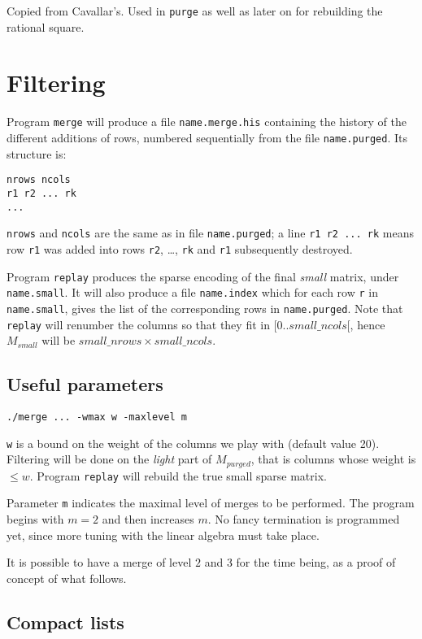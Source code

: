 \documentclass{article}
\begin{document}
Copied from Cavallar's. Used in \verb+purge+ as well as later on for
rebuilding the rational square.

\section{Filtering}

Program \verb+merge+
will produce a file \verb+name.merge.his+ containing the history of
the different additions of rows, numbered sequentially from the file
\verb+name.purged+. Its structure is:
\begin{verbatim}
nrows ncols
r1 r2 ... rk
...
\end{verbatim}
\verb+nrows+ and \verb+ncols+ are the same as in file \verb+name.purged+;
a line \verb+r1 r2 ... rk+ means row \verb+r1+ was added into rows
\verb+r2+, \ldots, \verb+rk+ and \verb+r1+ subsequently destroyed.

Program \verb+replay+ produces the sparse encoding of the final {\em
small} matrix, under \verb+name.small+. It will also produce a file
\verb+name.index+ which for each row \verb+r+ in \verb+name.small+,
gives the list of the corresponding rows in \verb+name.purged+. Note
that \verb+replay+ will renumber the columns so that they fit in
$[0..small\_ncols[$, hence $M_{small}$ will be $small\_nrows \times
small\_ncols$.

\subsection{Useful parameters}

\begin{verbatim}
./merge ... -wmax w -maxlevel m
\end{verbatim}
\verb+w+ is a bound on the weight of the columns we play
with (default value 20). Filtering will be done on the {\em light}
part of $M_{purged}$, that is columns whose weight is $\leq
w$. Program \verb+replay+ will rebuild the true small sparse matrix.

Parameter \verb+m+ indicates the maximal level of merges to be
performed. The program begins with $m=2$ and then increases $m$. No
fancy termination is programmed yet, since more tuning with the linear
algebra must take place.

It is possible to have a merge of level $2$ and $3$ for the time
being, as a proof of concept of what follows.

\subsection{Compact lists}
\end{document}
